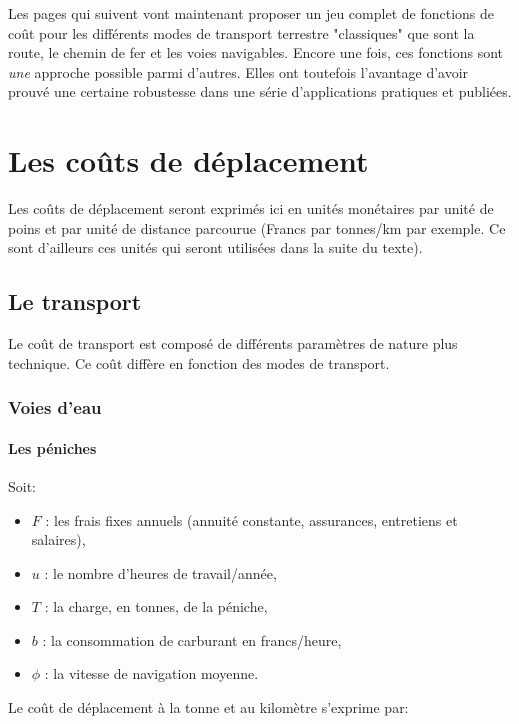 
Les pages qui suivent vont maintenant proposer un jeu complet de fonctions de
coût pour les différents modes de transport terrestre "classiques" que sont la
route, le chemin de fer et les voies navigables. Encore une fois, ces fonctions
sont { \it une} approche possible parmi d'autres. Elles ont toutefois l'avantage
d'avoir prouvé une certaine robustesse dans une série d'applications pratiques
et publiées.



\section{Les co\^uts de d\'eplacement}

Les coûts de déplacement seront exprimés ici en unités monétaires par unité de
poins et par unité de distance parcourue (Francs par tonnes/km par exemple. Ce
sont d'ailleurs ces unités qui seront utilisées dans la suite du texte).


\subsection{Le transport}

Le coût de transport est composé de différents paramètres de nature plus
tech\-nique. Ce coût diffère en fonction des modes de transport.

\subsubsection{Voies d'eau}

\paragraph{Les péniches}

Soit:

\begin{itemize}
\item $F$ : les frais fixes annuels (annuité constante, assurances,
entretiens et salaires),
\item $u$ : le nombre d'heures de travail/année,
\item $T$ : la charge, en tonnes, de la péniche,
\item $b$ : la consommation de carburant en francs/heure,
\item $\phi$ : la vitesse de navigation moyenne.
\end{itemize}
Le coût de déplacement à la tonne et au kilomètre s'exprime par:

